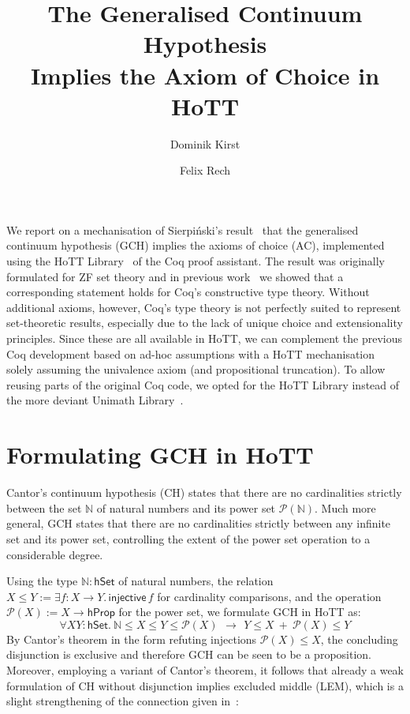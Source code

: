 \documentclass{easychair}
\title{The Generalised Continuum Hypothesis\\Implies the Axiom of Choice in HoTT}
\author{Dominik Kirst \and Felix Rech}
\institute{Saarland University, Saarland Informatics Campus, Germany}
\newcommand{\nat}{\mathbb{N}}
\newcommand{\pow}{\mathcal{P}}
\newcommand{\hprop}{\mathsf{hProp}}
\newcommand{\hset}{\mathsf{hSet}}
\begin{document}
\maketitle

We report on a mechanisation of Sierpi\'nski's result~\cite{sierpinski1947hypothese} that the generalised continuum hypothesis (GCH) implies the axioms of choice (AC), implemented using the HoTT Library~\cite{bauer2017hott} of the Coq proof assistant.
The result was originally formulated for ZF set theory and in previous work~\cite{kirst2021generalised} we showed that a corresponding statement holds for Coq's constructive type theory.
Without additional axioms, however, Coq's type theory is not perfectly suited to represent set-theoretic results, especially due to the lack of unique choice and extensionality principles.
Since these are all available in HoTT, we can complement the previous Coq development based on ad-hoc assumptions with a HoTT mechanisation solely assuming the univalence axiom (and propositional truncation).
To allow reusing parts of the original Coq code, we opted for the HoTT Library instead of the more deviant Unimath Library~\cite{UniMath}.

\section{Formulating GCH in HoTT}

Cantor's continuum hypothesis (CH) states that there are no cardinalities strictly between the set $\nat$ of natural numbers and its power set $\pow(\nat)$.
Much more general, GCH states that there are no cardinalities strictly between any infinite set and its power set, controlling the extent of the power set operation to a considerable degree.

Using the type $\nat:\hset$ of natural numbers, the relation $X\le Y:=\exists f:X\to Y.\, \mathsf{injective}\,f$ for cardinality comparisons, and the operation $\pow(X):=X\to\hprop$ for the power set, we formulate GCH in HoTT as:
$$\forall X Y:\hset.~\nat \le X\le Y\le \pow(X)~\,\to~\, Y\le X ~+~ \pow(X)\le Y$$
By Cantor's theorem in the form refuting injections $\pow(X)\le X$, the concluding disjunction is exclusive and therefore GCH can be seen to be a proposition.
Moreover, employing a variant of Cantor's theorem, it follows that already a weak formulation of CH without disjunction implies excluded middle (LEM), which is a slight strengthening of the connection given in~\cite{bridges2016continuum}:
\end{document}
